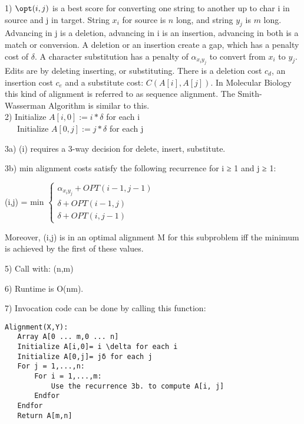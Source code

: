 1) $\opt(i,j)$ is a best score for converting one string to another up to char i in source and j in target.
String $x_i$ for source is $n$ long, and string $y_j$ is $m$ long. Advancing in j is a deletion,
advancing in i is an insertion, advancing in both is a match or conversion.  A deletion or 
an insertion create a gap, which has a penalty cost of $\delta$.  A character substitution
has a penalty of $\alpha_{x_iy_j}$ to convert from $x_i$ to $y_j$.
Edits are by deleting inserting, or substituting.  There is a deletion cost $c_d$, an insertion cost $c_e$ 
and a substitute cost: $C(A[i],A[j]).$  In Molecular Biology this kind of alignment is referred 
to as sequence alignment.  The Smith-Wasserman Algorithm is similar to this.\\

2) Initialize $A[i,0] := i*\delta$ for each i\\
\ \ \ Initialize $A[0,j] := j*\delta$ for each j

3a) \opt(i) requires a 3-way decision for delete, insert, substitute.

3b) min alignment costs satisfy the following recurrence for i ≥ 1 and j ≥ 1:
    
\opt(i,j) = min
$\begin{cases}
    \alpha_{x_iy_j} + OPT(i - 1, j - 1)\\
    \delta + OPT(i - 1, j)\\ 
    \delta + OPT(i, j - 1)
\end{cases}$

Moreover, (i,j) is in an optimal alignment M for this subproblem iff the minimum is 
achieved by the first of these values.

5) Call with: \opt(n,m)

6) Runtime is O(nm).

7) Invocation code can be done by calling this function:

\begin{lstlisting}[label=lst3,mathescape,frame=single,numbers=right]
Alignment(X,Y):
   Array A[0 ... m,0 ... n]
   Initialize A[i,0]= i \delta for each i
   Initialize A[0,j]= jδ for each j
   For j = 1,...,n:
       For i = 1,...,m:
           Use the recurrence 3b. to compute A[i, j]
       Endfor
   Endfor
   Return A[m,n]
\end{lstlisting}


